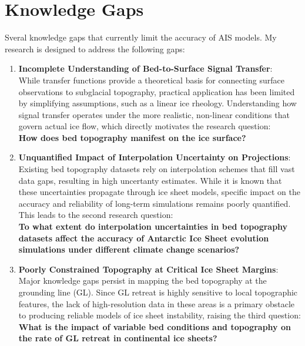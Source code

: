 \section{Knowledge Gaps}
Sveral knowledge gaps that currently limit the accuracy of AIS models. My research is designed to address the following gaps:
\begin{enumerate}
\item{\textbf{Incomplete Understanding of Bed-to-Surface Signal Transfer}}:\\While transfer functions provide a theoretical basis for connecting surface observations to subglacial topography, practical application has been limited by simplifying assumptions, such as a linear ice rheology. Understanding how signal transfer operates under the more realistic, non-linear conditions that govern actual ice flow, which directly motivates the research question:\\
\textbf{How does bed topography manifest on the ice surface?}

\item{\textbf{Unquantified Impact of Interpolation Uncertainty on Projections}}:\\Existing bed topography datasets rely on interpolation schemes that fill vast data gaps, resulting in high uncertanty estimates. While it is known that these uncertainties propagate through ice sheet models, specific impact on the accuracy and reliability of long-term simulations remains poorly quantified. This leads to the second research question:\\
\textbf{To what extent do interpolation uncertainties in bed topography datasets affect the accuracy of Antarctic Ice Sheet evolution simulations under different climate change scenarios?}

\item{\textbf{Poorly Constrained Topography at Critical Ice Sheet Margins}}:\\Major knowledge gaps persist in mapping the bed topography at the grounding line (GL). Since GL retreat is highly sensitive to local topographic features, the lack of high-resolution data in these areas is a primary obstacle to producing reliable models of ice sheet instability, raising the third question:\\
\textbf{What is the impact of variable bed conditions and topography on the rate of GL retreat in continental ice sheets?}
\end{enumerate}
